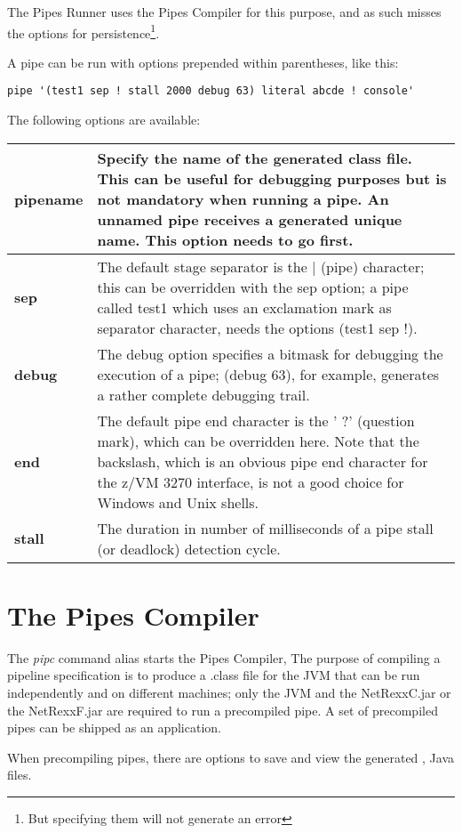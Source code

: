 The Pipes Runner uses the Pipes
Compiler for this purpose, and as such misses the options for
persistence\footnote{But specifying them will not generate an error}.

A pipe can be run with options prepended within parentheses, like this:
\begin{lstlisting}
pipe '(test1 sep ! stall 2000 debug 63) literal abcde ! console'
\end{lstlisting}

The following options are
available:

\begin{tabularx}{\textwidth}{>{\bfseries}lX}
\toprule
pipename&Specify the name of the generated class file. This
can be useful for debugging purposes but is not mandatory when running
a pipe. An unnamed pipe receives a generated unique name. This option
needs to go first.
\\\midrule
sep&The default stage separator is the |
(pipe) character; this can be overridden with the sep option; a pipe
called test1 which uses an exclamation mark as separator character,
needs the options (test1 sep !).
\\\midrule
debug&The debug option specifies a bitmask for
debugging the execution of a pipe; (debug 63), for
example, generates a rather complete debugging trail.
\\\midrule
end&The default pipe end character is the ' ?'
  (question mark), which can be overridden here. Note that the
  backslash, which is an obvious pipe end character for the z/VM 3270
  interface, is not a good choice for Windows and Unix shells.
\\\midrule
stall& The duration in number of milliseconds of a pipe stall (or deadlock)
detection cycle.
\\\bottomrule
\end{tabularx}


\chapter{The Pipes Compiler}
The \emph{pipc} command alias starts the Pipes Compiler,
The purpose of compiling a pipeline specification is to produce a
.class file for the JVM that can be run independently and on different
machines; only the JVM and the NetRexxC.jar or the NetRexxF.jar are
required to run a precompiled pipe. A set of precompiled pipes can be
shipped as an application.

When precompiling pipes, there are options to save and view the
generated \nr{}, Java files.

